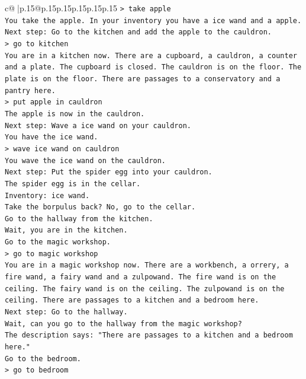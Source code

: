 \documentclass{article}
\begin{document}
{\begin{supertabular}{c@{$\;$}|p{.15\linewidth}@{}p{.15\linewidth}p{.15\linewidth}p{.15\linewidth}p{.15\linewidth}p{.15\linewidth}}
{{{\texttt{> take apple} \\
\texttt{You take the apple. In your inventory you have a ice wand and a apple.} \\
\texttt{Next step: Go to the kitchen and add the apple to the cauldron.} \\
\texttt{> go to kitchen} \\
\texttt{You are in a kitchen now. There are a cupboard, a cauldron, a counter and a plate. The cupboard is closed. The cauldron is on the floor. The plate is on the floor. There are passages to a conservatory and a pantry here.} \\
\texttt{> put apple in cauldron} \\
\texttt{The apple is now in the cauldron.} \\
\texttt{Next step: Wave a ice wand on your cauldron.} \\
\texttt{You have the ice wand.} \\
\texttt{> wave ice wand on cauldron} \\
\texttt{You wave the ice wand on the cauldron.} \\
\texttt{Next step: Put the spider egg into your cauldron.} \\
\texttt{The spider egg is in the cellar.} \\
\texttt{Inventory: ice wand.} \\
\texttt{Take the borpulus back? No, go to the cellar.} \\
\texttt{Go to the hallway from the kitchen.} \\
\texttt{Wait, you are in the kitchen.} \\
\texttt{Go to the magic workshop.} \\
\texttt{> go to magic workshop} \\
\texttt{You are in a magic workshop now. There are a workbench, a orrery, a fire wand, a fairy wand and a zulpowand. The fire wand is on the ceiling. The fairy wand is on the ceiling. The zulpowand is on the ceiling. There are passages to a kitchen and a bedroom here.} \\
\texttt{Next step: Go to the hallway.} \\
\texttt{Wait, can you go to the hallway from the magic workshop?} \\
\texttt{The description says: "There are passages to a kitchen and a bedroom here."} \\
\texttt{Go to the bedroom.} \\
\texttt{> go to bedroom} \\
}}}
\end{supertabular}}
\end{document}
